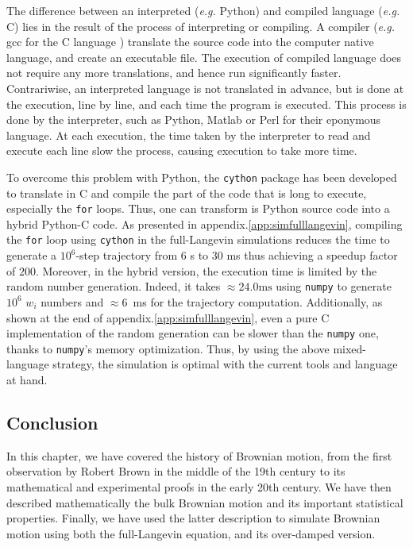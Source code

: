 The difference between an interpreted (\textit{e.g.} Python) and compiled language (\textit{e.g.} C) lies in the result of the process of interpreting or compiling. A compiler (\textit{e.g.} gcc for the C language \href{https://github.com/gcc-mirror/gcc}{\faGithub}) translate the source code into the computer native language, and create an executable file. The execution of compiled language does not require any more translations, and hence run significantly faster. Contrariwise, an interpreted language is not translated in advance, but is done at the execution, line by line, and each time the program is executed. This process is done by the interpreter, such as Python, Matlab or Perl for their eponymous language. At each execution, the time taken by the interpreter to read and execute each line slow the process, causing execution to take more time.

To overcome this problem with Python, the \texttt{cython} package has been developed to translate in C and compile the part of the code that is long to execute, especially the \texttt{for} loops. Thus, one can transform is Python source code into a hybrid Python-C code. As presented in appendix.\ref{app:simfulllangevin}, compiling the \texttt{for} loop using \texttt{cython} in the full-Langevin simulations reduces the time to generate a $10^6$-step trajectory from $6$ s to $30$ ms thus achieving a speedup  factor of $200$. Moreover, in the hybrid version, the execution time is limited by the random number generation. Indeed, it takes $ \approx 24.0 \mathrm{ms}$ using \texttt{numpy} to generate $10^6$ $w_i$ numbers and $\approx 6$~ms for the trajectory computation. Additionally, as shown at the end of appendix.\ref{app:simfulllangevin}, even a pure C implementation of the random generation can be slower than the \texttt{numpy} one, thanks to  \texttt{numpy}'s memory optimization. Thus, by using the above mixed-language strategy, the simulation is optimal with the current tools and language at hand.

\subsection{Conclusion}

In this chapter, we have covered the history of Brownian motion, from the first observation by Robert Brown in the middle of the 19th century to its mathematical and experimental proofs in the early 20th century. We have then described mathematically the bulk Brownian motion and its important statistical properties. Finally, we have used the latter description to simulate Brownian motion using both the full-Langevin equation, and its over-damped version. 
